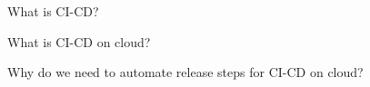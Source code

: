 What is CI-CD?

What is CI-CD on cloud?

Why do we need to automate release steps for CI-CD on cloud?